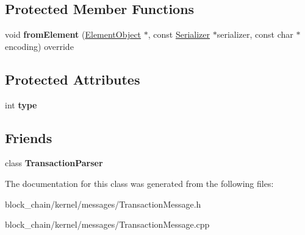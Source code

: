 \subsection*{Protected Member Functions}
\begin{DoxyCompactItemize}
\item 
\mbox{\label{classTransactionMessage_a2fbe322d67154d3bcbcc44943eeeb1ef}} 
void {\bfseries from\+Element} (\mbox{\hyperlink{classElementObject}{Element\+Object}} $\ast$, const \mbox{\hyperlink{classSerializer}{Serializer}} $\ast$serializer, const char $\ast$encoding) override
\end{DoxyCompactItemize}
\subsection*{Protected Attributes}
\begin{DoxyCompactItemize}
\item 
\mbox{\label{classMessage_afbfb481c98b13d0deba0bac443bebe29}} 
int {\bfseries type}
\end{DoxyCompactItemize}
\subsection*{Friends}
\begin{DoxyCompactItemize}
\item 
\mbox{\label{classTransactionMessage_a760b1478b5214c122458f0f19d45c127}} 
class {\bfseries Transaction\+Parser}
\end{DoxyCompactItemize}


The documentation for this class was generated from the following files\+:\begin{DoxyCompactItemize}
\item 
block\+\_\+chain/kernel/messages/Transaction\+Message.\+h\item 
block\+\_\+chain/kernel/messages/Transaction\+Message.\+cpp\end{DoxyCompactItemize}
